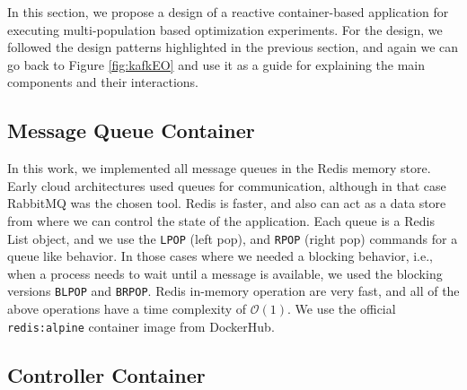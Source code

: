 \documentclass[review]{elsarticle}
\begin{document}
In this section, we propose a design of a reactive container-based application
for executing multi-population based optimization experiments.  For the design,
we followed the design patterns highlighted in the previous section, and again
we can go back to Figure \ref{fig:kafkEO} and use it as a guide for explaining
the main components and their interactions. 



 

\subsection{Message Queue Container} 
\label{message_container}

In this work, we implemented all message
queues in the Redis memory store. Early cloud architectures
\cite{de2017parallel} used queues for communication, although in that
case RabbitMQ was the chosen tool. Redis is faster, and also can act
as a data store from where we can control the state of the application.
Each queue is a Redis List object, and we use
the \texttt{LPOP} (left pop), and \texttt{RPOP} (right pop) commands for a queue like behavior.
In those cases where we needed a blocking behavior, i.e., when a process needs
to wait until a message is available, we used the blocking versions \texttt{BLPOP} and
\texttt{BRPOP}. Redis in-memory operation are very fast, and all of the above 
operations have a time complexity of $\mathcal{O}(1)$. We use the official 
\texttt{redis:alpine} container image from DockerHub.  

\subsection{Controller Container} 
\label{controller}
\end{document}
